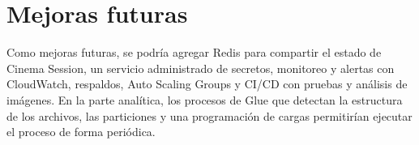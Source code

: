 ﻿\chapter{Mejoras futuras}
Como mejoras futuras, se podría agregar Redis para compartir el estado de Cinema Session, un servicio administrado de secretos, monitoreo y alertas con CloudWatch, respaldos, Auto Scaling Groups y CI/CD con pruebas y análisis de imágenes. En la parte analítica, los procesos de Glue que detectan la estructura de los archivos, las particiones y una programación de cargas permitirían ejecutar el proceso de forma periódica.
